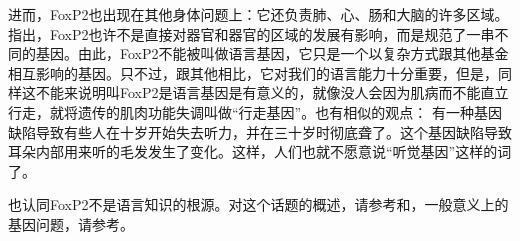 %
进而，FoxP2也出现在其他身体问题上：它还负责肺、心、肠和大脑的许多区域\citep{MF2003a}。\citet[--261]{MF2003a}指出，FoxP2也许不是直接对器官和器官的区域的发展有影响，而是规范了一串不同的基因。由此，FoxP2不能被叫做语言基因，它只是一个以复杂方式跟其他基金相互影响的基因。只不过，跟其他相比，它对我们的语言能力十分重要，但是，同样这不能来说明叫FoxP2是语言基因是有意义的，就像没人会因为肌病而不能直立行走，就将遗传的肌肉功能失调叫做“行走基因”\citep[]{Bishop2002a}。\citet[]{Karmiloff-Smith98a}也有相似的观点：
  有一种基因缺陷导致有些人在十岁开始失去听力，并在三十岁时彻底聋了。这个基因缺陷导致耳朵内部用来听的毛发发生了变化。这样，人们也就不愿意说“听觉基因”这样的词了。

\largerpage[1]
\citet*[]{FHC2005a}也认同FoxP2不是语言知识的根源。对这个话题的概述，请参考和，一般意义上的基因问题，请参考。

